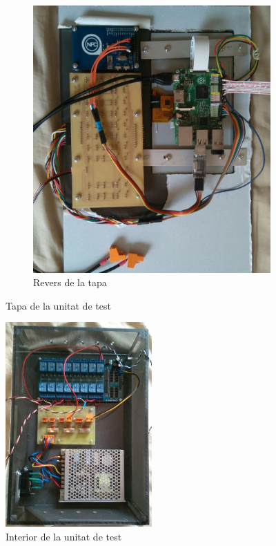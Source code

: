 \begin{figure}[H]
\begin{subfigure}[b]{0.50\textwidth}
		\includegraphics[width=\textwidth]{images/demonstrator_back}
		\caption{Revers de la tapa}
		\label{fig:admin2}
	\end{subfigure}
	\caption{Tapa de la unitat de test}
	\label{fig:intro-example}
\end{figure}
\vspace{-1em}
\begin{figure}[H]
\center
\includegraphics[width=0.5\textwidth, angle =90]{images/demonstrator_bottom}
\caption{Interior de la unitat de test}
\label{fig:demonstrator_diagram}
\end{figure}
